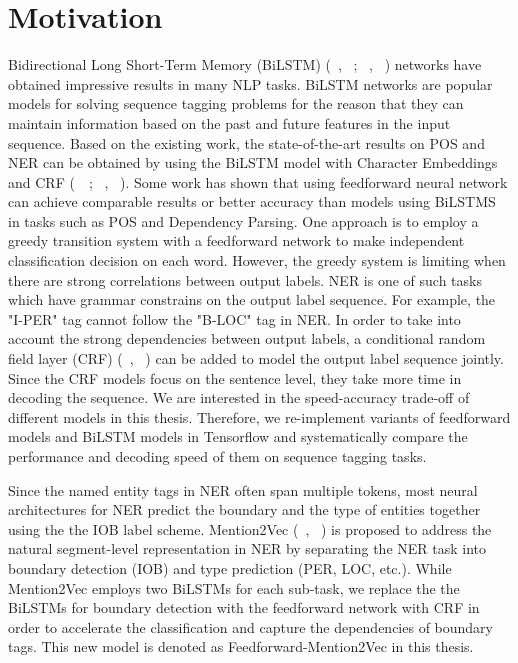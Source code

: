 \documentclass{sfuthesis}
\begin{document}
\section{Motivation}

Bidirectional Long Short-Term Memory (BiLSTM) (~\citeauthor{Hochreiter97longshort-term}, ~\citeyear{Hochreiter97longshort-term}; ~\citeauthor{graves2005framewise}, ~\citeyear{graves2005framewise}) networks have obtained impressive results in many NLP tasks. BiLSTM networks are popular models for solving sequence tagging problems for the reason that they can maintain information based on the past and future features in the input sequence. Based on the existing work, the state-of-the-art results on POS and NER can be obtained by using the BiLSTM model with Character Embeddings and CRF (~\citeauthor{ling2015finding}~\citeyear{ling2015finding}; ~\citeauthor{lample2016neural}, ~\citeyear{lample2016neural}). Some work has shown that using feedforward neural network can achieve comparable results or better accuracy than models using BiLSTMS in tasks such as POS and Dependency Parsing. One approach is to employ a greedy transition system with a feedforward network to make independent classification decision on each word. However, the greedy system is limiting when there are strong correlations between output labels. NER is one of such tasks which have grammar constrains on the output label sequence. For example, the "I-PER" tag cannot follow the "B-LOC" tag in NER. In order to take into account the strong dependencies between output labels, a conditional random field layer (CRF) (~\citeauthor{lafferty2001conditional}, ~\citeyear{lafferty2001conditional}) can be added to model the output label sequence jointly. Since the CRF models focus on the sentence level, they take more time in decoding the sequence. We are interested in the speed-accuracy trade-off of different models in this thesis. Therefore, we re-implement variants of feedforward models and BiLSTM models in Tensorflow and systematically compare the performance and decoding speed of them on sequence tagging tasks.

Since the named entity tags in NER often span multiple tokens, most neural architectures for NER predict the boundary and the type of entities together using the the IOB label scheme. Mention2Vec (~\citeauthor{stratos2016mention2vec}, ~\citeyear{stratos2016mention2vec}) is proposed to address the natural segment-level representation in NER by separating the NER task into boundary detection (IOB) and type prediction (PER, LOC, etc.). While Mention2Vec employs two BiLSTMs for each sub-task, we replace the the BiLSTMs for boundary detection with the feedforward network with CRF in order to accelerate the classification and capture the dependencies of boundary tags. This new model is denoted as Feedforward-Mention2Vec in this thesis.
\end{document}
